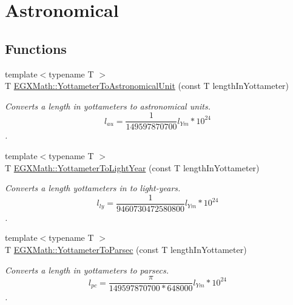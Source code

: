 \hypertarget{group___e_g_x_math-_conversions-_length_conversions-_s_i-_yottameter-_astronomical}{}\section{Astronomical}
\label{group___e_g_x_math-_conversions-_length_conversions-_s_i-_yottameter-_astronomical}
\subsection*{Functions}
\begin{DoxyCompactItemize}
\item 
{\footnotesize template$<$typename T $>$ }\\T \mbox{\hyperlink{group___e_g_x_math-_conversions-_length_conversions-_s_i-_yottameter-_astronomical_gab75681ecd108900ae547e58495a62dd3}{E\+G\+X\+Math\+::\+Yottameter\+To\+Astronomical\+Unit}} (const T length\+In\+Yottameter)
\begin{DoxyCompactList}\small\item\em Converts a length in yottameters to astronomical units. \[ l_{au}= \frac{1}{149597870700} l_{Ym} * 10^{24} \]. \end{DoxyCompactList}\item 
{\footnotesize template$<$typename T $>$ }\\T \mbox{\hyperlink{group___e_g_x_math-_conversions-_length_conversions-_s_i-_yottameter-_astronomical_ga0ab87688c8dea9fb838a3bca34cba82c}{E\+G\+X\+Math\+::\+Yottameter\+To\+Light\+Year}} (const T length\+In\+Yottameter)
\begin{DoxyCompactList}\small\item\em Converts a length yottameters in to light-\/years. \[ l_{ly}= \frac{1}{9460730472580800} l_{Ym} * 10^{24} \]. \end{DoxyCompactList}\item 
{\footnotesize template$<$typename T $>$ }\\T \mbox{\hyperlink{group___e_g_x_math-_conversions-_length_conversions-_s_i-_yottameter-_astronomical_gadcada2ea03efbd6c010a780b87daf01f}{E\+G\+X\+Math\+::\+Yottameter\+To\+Parsec}} (const T length\+In\+Yottameter)
\begin{DoxyCompactList}\small\item\em Converts a length in yottameters to parsecs. \[ l_{pc}=\frac{\pi}{149597870700 * 648000} l_{Ym} * 10^{24} \]. \end{DoxyCompactList}\end{DoxyCompactItemize}


